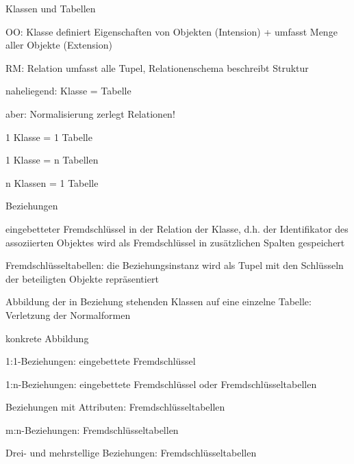 \documentclass[a4paper]{article}
\begin{document}
\begin{multicols}{3}
Klassen und Tabellen
\begin{itemize*}
    \item OO: Klasse definiert Eigenschaften von Objekten (Intension) + umfasst Menge aller Objekte (Extension)
    \item RM: Relation umfasst alle Tupel, Relationenschema beschreibt Struktur
    \item naheliegend: Klasse = Tabelle
    \item aber: Normalisierung zerlegt Relationen!
    \begin{itemize*}
        \item 1 Klasse = 1 Tabelle
        \item 1 Klasse = n Tabellen
        \item n Klassen = 1 Tabelle
    \end{itemize*}
\end{itemize*}

Beziehungen
\begin{itemize*}
    \item eingebetteter Fremdschlüssel in der Relation der Klasse, d.h. der Identifikator des assoziierten Objektes wird als Fremdschlüssel in zusätzlichen Spalten gespeichert
    \item Fremdschlüsseltabellen: die Beziehungsinstanz wird als Tupel mit den Schlüsseln der beteiligten Objekte repräsentiert
    \item Abbildung der in Beziehung stehenden Klassen auf eine einzelne Tabelle: Verletzung der Normalformen
    \item konkrete Abbildung
    \begin{itemize*}
        \item 1:1-Beziehungen: eingebettete Fremdschlüssel
        \item 1:n-Beziehungen: eingebettete Fremdschlüssel oder Fremdschlüsseltabellen
        \item Beziehungen mit Attributen: Fremdschlüsseltabellen
        \item m:n-Beziehungen: Fremdschlüsseltabellen
        \item Drei- und mehrstellige Beziehungen: Fremdschlüsseltabellen
    \end{itemize*}
\end{itemize*}


\end{multicols}
\end{document}
